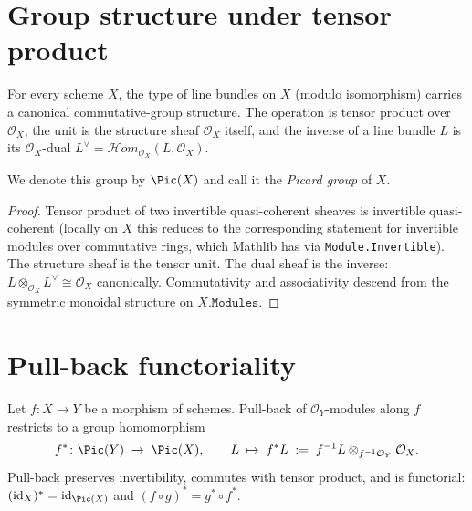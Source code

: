 \section{Group structure under tensor product}

\begin{theorem}
  \label{thm:Scheme_Pic_commGroup}
  \leanok
  For every scheme $X$, the type of line bundles on $X$ (modulo isomorphism) carries a canonical commutative-group structure. The operation is tensor product over $\mathcal O_X$, the unit is the structure sheaf $\mathcal O_X$ itself, and the inverse of a line bundle $L$ is its $\mathcal O_X$-dual $L^\vee = \mathcal{H}om_{\mathcal O_X}(L, \mathcal O_X)$.

  We denote this group by $\Pic(X)$ and call it the \emph{Picard group} of $X$.
\end{theorem}

\begin{proof}
  \leanok
  Tensor product of two invertible quasi-coherent sheaves is invertible quasi-coherent (locally on $X$ this reduces to the corresponding statement for invertible modules over commutative rings, which Mathlib has via \lstinline{Module.Invertible}). The structure sheaf is the tensor unit. The dual sheaf is the inverse: $L \otimes_{\mathcal O_X} L^\vee \cong \mathcal O_X$ canonically. Commutativity and associativity descend from the symmetric monoidal structure on $X.\mathtt{Modules}$.
\end{proof}

\section{Pull-back functoriality}

\begin{theorem}
  \label{thm:Scheme_Pic_pullback}
  \leanok
  Let $f \colon X \to Y$ be a morphism of schemes. Pull-back of $\mathcal O_Y$-modules along $f$ restricts to a group homomorphism
  \[
    f^* \colon \Pic(Y) \;\to\; \Pic(X),\qquad L \;\mapsto\; f^* L \;:=\; f^{-1} L \otimes_{f^{-1}\mathcal O_Y} \mathcal O_X.
  \]
  Pull-back preserves invertibility, commutes with tensor product, and is functorial: $(\mathrm{id}_X)^* = \mathrm{id}_{\Pic(X)}$ and $(f \circ g)^* = g^* \circ f^*$.
\end{theorem}

